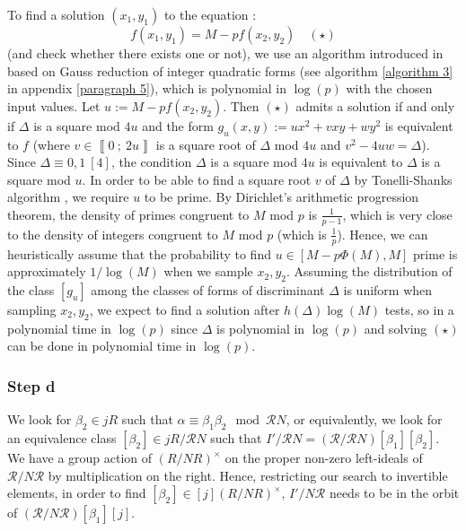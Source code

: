 \documentclass[a4paper,10pt]{report}
\theoremstyle{definition}
\theoremstyle{plain}
\theoremstyle{definition}
\newcommand{\m}[1]{\mathcal{#1}}
\renewcommand{\i}[2]{\left\llbracket #1~;~#2\right\rrbracket}
\renewcommand{\(}{\left(}
\renewcommand{\)}{\right)}
\begin{document}
To find a solution $(x_1,y_1)$ to the equation :
\[f(x_1,y_1)=M-pf(x_2,y_2)\quad (\star)\]
(and check whether there exists one or not), we use an algorithm introduced in \cite[§ 46, pp. 73-75]{Dickson} based on Gauss reduction of integer quadratic forms (see algorithm \ref{algorithm 3} in appendix \ref{paragraph 5}), which is polynomial in $\log(p)$ with the chosen input values. Let $u:=M-pf(x_2,y_2)$. Then $(\star)$ admits a solution if and only if $\Delta$ is a square mod $4u$ and the form $g_u(x,y):=ux^2+vxy+wy^2$ is equivalent to $f$ (where $v\in\i{0}{2u}$ is a square root of $\Delta$ mod $4u$ and $v^2-4uw=\Delta$).  Since $\Delta\equiv 0, 1 \ [4]$,  the condition $\Delta$ is a square mod $4u$ is equivalent to $\Delta$ is a square mod $u$. In order to be able to find a square root $v$ of $\Delta$ by Tonelli-Shanks algorithm \cite[algorithm 1.5.1]{Cohen1}, we require $u$ to be prime. By Dirichlet's arithmetic progression theorem, the density of primes congruent to $M$ mod $p$ is $\frac{1}{p-1}$, which is very close to the density of integers congruent to $M$ mod $p$ (which is $\frac{1}{p}$). Hence, we can heuristically assume that the probability to find $u\in [M-p\Phi(M),M]$ prime is approximately $1/\log(M)$ when we sample  $x_2,y_2$. Assuming the distribution of the class $[g_u]$ among the classes of forms of discriminant $\Delta$ is uniform when sampling $x_2,y_2$, we expect to find a solution after $h(\Delta)\log(M)$ tests, so in a polynomial time in $\log(p)$ since $\Delta$ is polynomial in $\log(p)$ and solving $(\star)$ can be done in polynomial time in $\log(p)$. 

\subsubsection{Step d}

We look for $\beta_2\in jR$ such that $\alpha\equiv\beta_1\beta_2 \mod \m{R}N$, or equivalently, we look for an equivalence class $[\beta_2]\in jR/\m{R}N$ such that $I'/\m{R}N=(\m{R}/\m{R}N)[\beta_1][\beta_2]$.  We have a group action of $(R/NR)^\times$ on the proper non-zero left-ideals of $\m{R}/N\m{R}$ by multiplication on the right. Hence, restricting our search to invertible elements, in order to find $[\beta_2]\in [j](R/NR)^\times $, $I'/N\m{R}$ needs to be in the orbit of $(\m{R}/N\m{R})[\beta_1][j]$.
\end{document}
